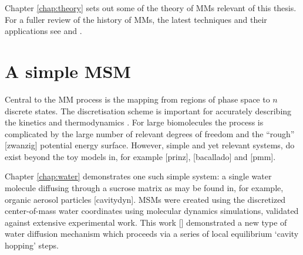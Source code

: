Chapter \ref{chap:theory} sets out some of the theory of MMs relevant of this thesis. For a fuller review of the history of MMs, the latest techniques and their applications see \cite{husicMarkovStateModels2018} and \cite{noeMarkovModelsMolecular2019b}. 

\section{A simple MSM}
Central to the MM process is the mapping from regions of phase space to $n$ discrete states. The discretisation scheme is important for accurately describing the kinetics and thermodynamics \cite{shallowayMacrostatesClassicalStochastic1996}. For large biomolecules the process is complicated by the large number of relevant degrees of freedom \cite{shallowayMacrostatesClassicalStochastic1996} and the ``rough'' [zwanzig] potential energy surface. However, simple and yet relevant systems, do exist beyond the toy models in, for example [prinz], [bacallado] and [pmm]. 

Chapter \ref{chap:water} demonstrates one such simple system: a single water molecule diffusing through a sucrose matrix as may be found in, for example, organic aerosol particles [cavitydyn]. MSMs were created using the discretized  center-of-mass water coordinates using molecular dynamics simulations, validated against extensive experimental work. This work [] demonstrated a new type of water diffusion mechanism which proceeds via a series of local equilibrium `cavity hopping' steps.  

